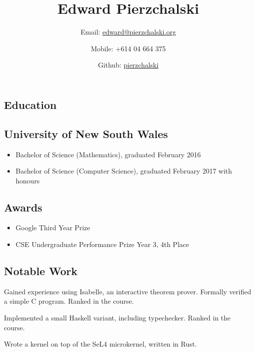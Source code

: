 \documentclass{article}
\title{Edward Pierzchalski}
\author{
  Email: \href{mailto:edward@pierzchalski.org}{edward@pierzchalski.org} 
  \and Mobile: +614 04 664 375
  \and Github: \href{https://github.com/pierzchalski}{pierzchalski}}
\date{}
\begin{document}
\maketitle
\vspace{-1cm}

\begin{multicols*}{2}

\section*{Education}

\subsection*{University of New South Wales}
\begin{itemize}[leftmargin=12pt, itemsep=-2pt]
 \item {Bachelor of Science (Mathematics), graduated February 2016}
 \item {Bachelor of Science (Computer Science), graduated February 2017 with honours}
\end{itemize}

\subsection*{Awards}

\begin{itemize}[leftmargin=12pt, itemsep=-2pt]
 \item {Google Third Year Prize}
 \item {CSE Undergraduate Performance Prize Year 3, 4th Place}
\end{itemize}

\subsection*{Notable Work}

\begin{description}[leftmargin=12pt, itemsep=-2pt]
 \item[Advanced Algorithmic Verification:] {
  Gained experience using Isabelle, an interactive theorem prover. Formally verified a simple C program. Ranked  in the course.
 }
 \item[Concepts of Programming Languages:] {
  Implemented a small Haskell variant, including typechecker. Ranked  in the course.
 }
 \item[Advanced Operating Systems:] {
  Wrote a kernel on top of the SeL4 microkernel, written in Rust.
 }


\end{description}
\end{multicols*}
\end{document}
